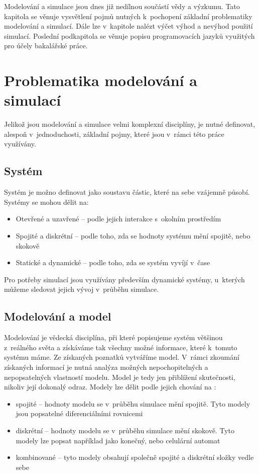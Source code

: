 Modelování a simulace jsou dnes již nedílnou součástí vědy a výzkumu. Tato kapitola se věnuje vysvětlení pojmů nutných k~pochopení základní problematiky modelování a simulací. Dále lze v~kapitole nalézt výčet výhod a nevýhod použití simulací. Poslední podkapitola se věnuje popisu programovacích jazyků využitých pro účely bakalářské práce.

\section{Problematika modelování a simulací}
Jelikož jsou modelování a simulace velmi komplexní disciplíny, je nutné definovat, alespoň v~jednoduchosti, základní pojmy, které jsou v~rámci této práce využívány.

\subsection{Systém}
Systém je možno definovat jako soustavu částic, které na sebe vzájemně působí. Systémy se mohou dělit na:

\begin{itemize}
    \item Otevřené a uzavřené -- podle jejich interakce s~okolním prostředím
    \item Spojité a diskrétní -- podle toho, zda se hodnoty systému mění spojitě, nebo skokově
    \item Statické a dynamické -- podle toho, zda se systém vyvíjí v~čase
\end{itemize}
Pro potřeby simulací jsou využívány především dynamické systémy, u~kterých můžeme sledovat jejich vývoj v~průběhu simulace.

\subsection{Modelování a model}
\label{modelovani}
Modelování je vědecká disciplína, při které popisujeme systém většinou z~reálného světa a získáváme tak všechny možné informace, které k~tomuto systému máme. Ze získaných poznatků vytváříme model. V~rámci zkoumání získaných informací je nutná analýza možných nepochopitelných a nepopsatelných vlastností modelu. Model je tedy jen přiblížení skutečnosti, nikoliv její dokonalý odraz. Modely lze dělit podle jejich chování na \cite{IMS-skripta}:

\begin{itemize}
    \item spojité -- hodnoty modelu se v~průběhu simulace mění spojitě. Tyto modely jsou popsatelné diferenciálními rovnicemi
    \item diskrétní -- hodnoty modelu se v~průběhu simulace mění skokově. Tyto modely lze popsat například jako konečný, nebo celulární automat
    \item kombinované -- tyto modely obsahují společně spojité a diskrétní složky vedle sebe
\end{itemize}

